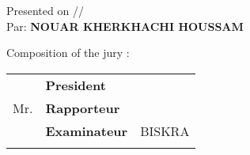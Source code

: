 \documentclass[12pt,oneside,english]{book}
\providecommand{\tabularnewline}{\\}
\begin{document}
\begin{titlepage}
\begin{center}
\par\end{center}

\begin{center}
Presented on \quad{}/\quad{}/\quad{}\\
Par: \textbf{NOUAR KHERKHACHI HOUSSAM}
\par\end{center}

\begin{center}
\vspace*{1.5cm}

\par\end{center}

Composition of the jury :\\
 

\begin{minipage}[t]{1\columnwidth}%
\begin{tabular}{lll}
 & \textbf{\small{}President} & \tabularnewline
Mr.  & \textbf{\small{}Rapporteur} & \tabularnewline
 & \textbf{\small{}Examinateur} & {\small{}BISKRA }\tabularnewline
 &  & \tabularnewline
\end{tabular}%
\end{minipage}

\end{titlepage}
\end{document}
